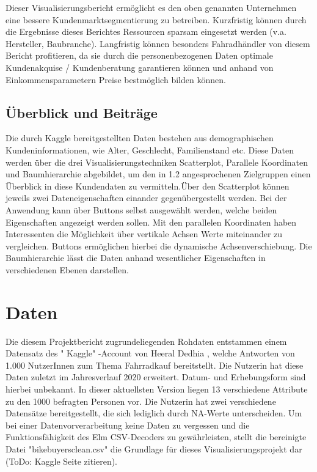 \documentclass[usegeometry=true]{scrartcl}
\begin{document}
Dieser Visualisierungsbericht ermöglicht es den oben genannten Unternehmen eine bessere Kundenmarktsegmentierung zu betreiben. Kurzfristig können durch die Ergebnisse dieses Berichtes Ressourcen sparsam eingesetzt werden (v.a. Hersteller, Baubranche). Langfristig können besonders Fahradhändler von diesem Bericht profitieren, da sie durch die personenbezogenen Daten optimale Kundenakquise / Kundenberatung garantieren können und anhand von Einkommensparametern Preise bestmöglich bilden können. 



\subsection{Überblick und Beiträge}
Die durch Kaggle bereitgestellten Daten bestehen aus demographischen Kundeninformationen, wie Alter, Geschlecht, Familienstand etc.  Diese Daten werden über die drei Visualisierungstechniken Scatterplot, Parallele Koordinaten und Baumhierarchie abgebildet, um den in 1.2 angesprochenen Zielgruppen einen Überblick in diese Kundendaten zu vermitteln.Über den Scatterplot können jeweils zwei Dateneigenschaften einander gegenübergestellt werden. Bei der Anwendung kann über Buttons selbst ausgewählt werden, welche beiden Eigenschaften angezeigt werden sollen. Mit den parallelen Koordinaten haben Interessenten die Möglichkeit über vertikale Achsen Werte miteinander zu vergleichen. Buttons ermöglichen hierbei die dynamische Achsenverschiebung. Die Baumhierarchie lässt die Daten anhand wesentlicher Eigenschaften in verschiedenen Ebenen darstellen. 

\section{Daten}
Die diesem Projektbericht zugrundeliegenden Rohdaten entstammen einem Datensatz des " Kaggle" -Account von Heeral Dedhia \cite{Dedhia.22.09.2020}, welche Antworten von 1.000 NutzerInnen zum Thema Fahrradkauf bereitstellt. Die Nutzerin hat diese Daten zuletzt im Jahresverlauf 2020 erweitert. Datum- und Erhebungsform sind hierbei unbekannt. In dieser aktuellsten Version liegen 13 verschiedene Attribute zu den 1000 befragten Personen vor. Die Nutzerin hat zwei verschiedene Datensätze bereitgestellt, die sich lediglich durch NA-Werte unterscheiden. Um bei einer Datenvorverarbeitung keine Daten zu vergessen und die Funktionsfähigkeit des Elm CSV-Decoders zu gewährleisten, stellt die bereinigte Datei "bikebuyersclean.csv" die Grundlage für dieses Visualisierungsprojekt dar (ToDo: Kaggle Seite zitieren). 
\end{document}
